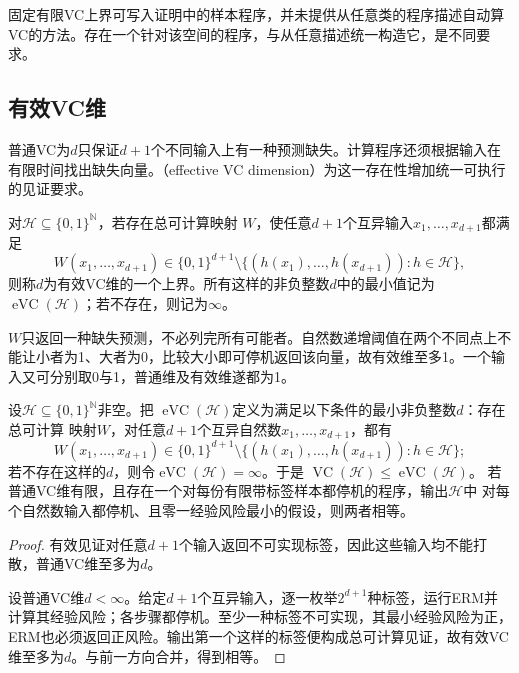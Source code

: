 固定有限VC上界可写入证明中的样本程序，并未提供从任意类的程序描述自动算VC的方法。存在一个针对该空间的程序，与从任意描述统一构造它，是不同要求。

\subsection{有效VC维}

普通VC为$d$只保证$d+1$个不同输入上有一种预测缺失。计算程序还须根据输入在有限时间找出缺失向量。（effective VC dimension）为这一存在性增加统一可执行的见证要求。

\begin{definition}[有效VC维]
\label{def:effective-vc-dimension}
对$\mathcal H\subseteq\{0,1\}^{\mathbb N}$，若存在总可计算映射
$W$，使任意$d+1$个互异输入$x_1,\ldots,x_{d+1}$都满足
\[
 W(x_1,\ldots,x_{d+1})\in\{0,1\}^{d+1}
 \setminus\{(h(x_1),\ldots,h(x_{d+1})):h\in\mathcal H\},
\]
则称$d$为有效VC维的一个上界。所有这样的非负整数$d$中的最小值记为
$\operatorname{eVC}(\mathcal H)$；若不存在，则记为$\infty$。
\end{definition}

$W$只返回一种缺失预测，不必列完所有可能者。自然数递增阈值在两个不同点上不能让小者为1、大者为0，比较大小即可停机返回该向量，故有效维至多1。一个输入又可分别取0与1，普通维及有效维遂都为1。

\begin{theorem}[普通VC维与有效VC维的比较]
\label{thm:effective-vc-comparison}
设$\mathcal H\subseteq\{0,1\}^{\mathbb N}$非空。把
$\operatorname{eVC}(\mathcal H)$定义为满足以下条件的最小非负整数$d$：存在总可计算
映射$W$，对任意$d+1$个互异自然数$x_1,\ldots,x_{d+1}$，都有
\[
 W(x_1,\ldots,x_{d+1})\in\{0,1\}^{d+1}
 \setminus\{(h(x_1),\ldots,h(x_{d+1})):h\in\mathcal H\};
\]
若不存在这样的$d$，则令$\operatorname{eVC}(\mathcal H)=\infty$。于是
$\operatorname{VC}(\mathcal H)\leq\operatorname{eVC}(\mathcal H)$。
若普通VC维有限，且存在一个对每份有限带标签样本都停机的程序，输出$\mathcal H$中
对每个自然数输入都停机、且零一经验风险最小的假设，则两者相等。
\end{theorem}

\begin{proof}
有效见证对任意$d+1$个输入返回不可实现标签，因此这些输入均不能打散，普通VC维至多为$d$。

设普通VC维$d<\infty$。给定$d+1$个互异输入，逐一枚举$2^{d+1}$种标签，运行ERM并计算其经验风险；各步骤都停机。至少一种标签不可实现，其最小经验风险为正，ERM也必须返回正风险。输出第一个这样的标签便构成总可计算见证，故有效VC维至多为$d$。与前一方向合并，得到相等。
\end{proof}

